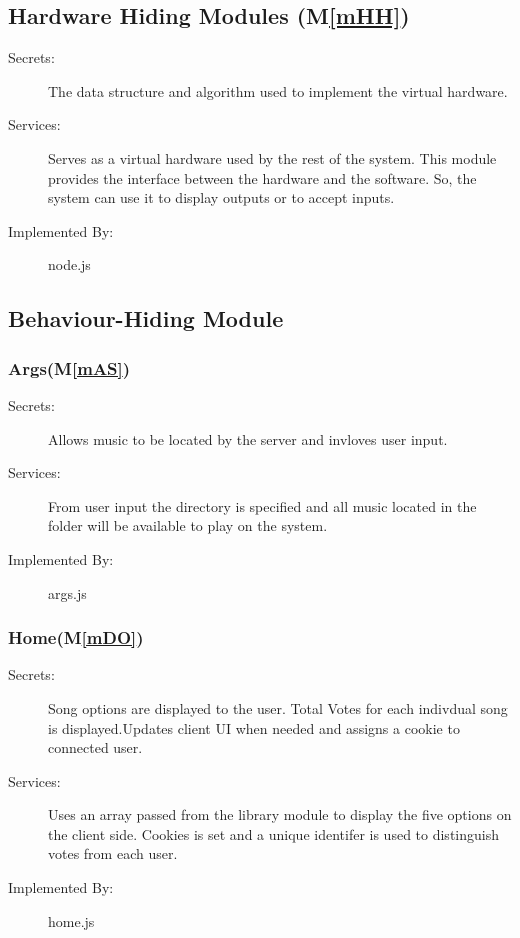 \documentclass[12pt, titlepage]{article}
\newcommand{\mref}[1]{M\ref{#1}}
\begin{document}
\subsection{Hardware Hiding Modules (\mref{mHH})}


\begin{description}
\item[Secrets:]The data structure and algorithm used to implement the virtual
 hardware.
\item[Services:]Serves as a virtual hardware used by the rest of the
 system. This module provides the interface between the hardware and the
 software. So, the system can use it to display outputs or to accept inputs.
\item[Implemented By:] node.js
\end{description}


\subsection{Behaviour-Hiding Module}

\subsubsection{Args(\mref{mAS})}


\begin{description}
\item[Secrets:]Allows music to be located by the server and invloves user input.
\item[Services:]From user input the directory is specified and all music located in the folder will be available to play on the system.
\item[Implemented By:] args.js
\end{description}

\subsubsection{Home(\mref{mDO})}


\begin{description}
\item[Secrets:]Song options are displayed to the user. Total Votes for each indivdual song is displayed.Updates client UI when needed and assigns a cookie to connected user.
\item[Services:]Uses an array passed from the library module to display the five options on the client side. Cookies is set and a unique identifer is used to distinguish votes from each user.
\item[Implemented By:] home.js
\end{description}
\end{document}
